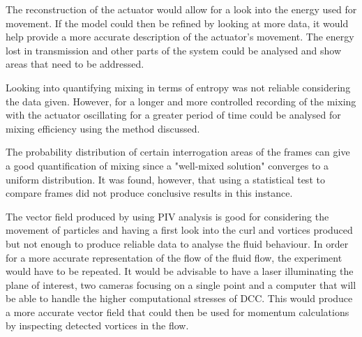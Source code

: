 The reconstruction of the actuator would allow for a look into the energy used for movement. If the model could then be refined by looking at more data, it would help provide a more accurate description of the actuator's movement. The energy lost in transmission and other parts of the system could be analysed and show areas that need to be addressed.

Looking into quantifying mixing in terms of entropy was not reliable considering the data given. However, for a longer and more controlled recording of the mixing with the actuator oscillating for a greater period of time could be analysed for mixing efficiency using the method discussed. 

The probability distribution of certain interrogation areas of the frames can give a good quantification of mixing since a "well-mixed solution" converges to a uniform distribution. It was found, however, that using a statistical test to compare frames did not produce conclusive results in this instance.

The vector field produced by using PIV analysis is good for considering the movement of particles and having a first look into the curl and vortices produced but not enough to produce reliable data to analyse the fluid behaviour. In order for a more accurate representation of the flow of the fluid flow, the experiment would have to be repeated. It would be advisable to have a laser illuminating the plane of interest, two cameras focusing on a single point and a computer that will be able to handle the higher computational stresses of DCC. This would produce a more accurate vector field that could then be used for momentum calculations by inspecting detected vortices in the flow.  
